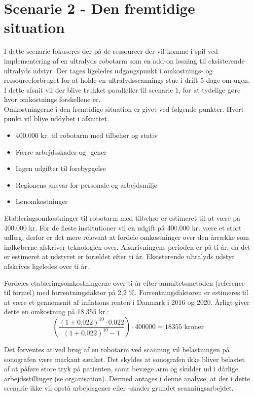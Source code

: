 \section{Scenarie 2 - Den fremtidige situation}
I dette scenarie fokuseres der på de ressourcer der vil komme i spil ved implementering af en ultralyds robotarm som en add-on løsning til eksisterende ultralyds udstyr. Der tages ligeledes udgangspunkt i omkostnings- og ressourceforbruget for at holde en ultralydsscannings stue i drift 5 dage om ugen. I dette afsnit vil der blive trukket paralleller til scenarie 1, for at tydelige gøre hvor omkostnings forskellene er. \\
Omkostningerne i den fremtidige situation er givet ved følgende punkter. Hvert punkt vil blive uddybet i afsnittet.
\begin{itemize}
\item 400.000 kr. til robotarm med tilbehør og stativ
\item Færre arbejdsskader og -gener
\item Ingen udgifter til forebyggelse
\item Regionens ansvar for personale og arbejdsmiljø
\item Lønomkostninger
\end{itemize}
Etableringsomkostninger til robotarm med tilbehør er estimeret til at være på 400.000 kr. For de fleste institutioner vil en udgift på 400.000 kr. være et stort udlæg, derfor er det mere relevant at fordele omkostninger over den årrække som indkøberne afskriver teknologien over. Afskrivningens perioden er på ti år, da det er estimeret at udstyret er forældet efter ti år. Eksisterende ultralyds udstyr afskrives ligeledes over ti år. 

Fordeles etableringsomkostningerne over ti år efter annuitetsmetoden (reference til formel) med forrentningsfaktor på 2,2 \%. Forrentningsfaktoren er estimeres til at være et gennemsnit af inflations renten i Danmark i 2016 og 2020. Årligt giver dette en omkostning på 18.355 kr.:
\begin{equation}
\left(\frac{(1+0.022)^{10}\cdot0.022}{(1+0.022)^{10}-1}\right)\cdot400000=18355 \text{ kroner}
\end{equation}

Det forventes at ved brug af en robotarm ved scanning vil belastningen på sonografen være markant sænket. Det skyldes at sonografen ikke bliver belastet af at påføre store tryk på patienten, samt bevæge arm og skulder ud i dårlige arbejdsstillinger (se organisation). Dermed antages i denne analyse, at der i dette scenarie ikke vil opstå arbejdsgener eller -skader grundet scanningsarbejdet. 

